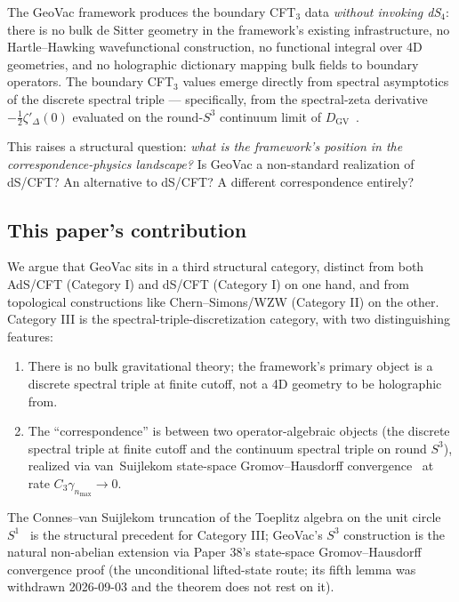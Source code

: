 \documentclass[11pt,a4paper]{article}
\theoremstyle{plain}
\theoremstyle{definition}
\newcommand{\nmax}{n_{\max}}
\newcommand{\sthree}{S^{3}}
\newcommand{\DGV}{D_{\mathrm{GV}}}
\begin{document}
The GeoVac framework produces the boundary CFT$_{3}$ data
\emph{without invoking dS$_{4}$}: there is no bulk de Sitter
geometry in the framework's existing infrastructure, no Hartle--Hawking
wavefunctional construction, no functional integral over 4D
geometries, and no holographic dictionary mapping bulk fields to
boundary operators. The boundary CFT$_{3}$ values emerge directly
from spectral asymptotics of the discrete spectral triple ---
specifically, from the spectral-zeta derivative $-\tfrac{1}{2}
\zeta'_{\Delta}(0)$ evaluated on the round-$\sthree$ continuum limit
of $\DGV$~\cite{paper50}.

This raises a structural question: \emph{what is the framework's
position in the correspondence-physics landscape?} Is GeoVac a
non-standard realization of dS/CFT? An alternative to dS/CFT? A
different correspondence entirely?

\subsection{This paper's contribution}

We argue that GeoVac sits in a third structural category, distinct
from both AdS/CFT (Category I) and dS/CFT (Category I) on one hand,
and from topological constructions like Chern--Simons/WZW
(Category II) on the other. Category III is the
spectral-triple-discretization category, with two distinguishing
features:
\begin{enumerate}
\item There is no bulk gravitational theory; the framework's primary
object is a discrete spectral triple at finite cutoff, not a 4D
geometry to be holographic from.
\item The ``correspondence'' is between two operator-algebraic
objects (the discrete spectral triple at finite cutoff and the
continuum spectral triple on round $\sthree$), realized via
van~Suijlekom state-space Gromov--Hausdorff convergence~\cite{paper38} at rate
$C_{3} \gamma_{\nmax} \to 0$.
\end{enumerate}

The Connes--van Suijlekom truncation of the Toeplitz algebra on the
unit circle $S^{1}$~\cite{connes_vs2021} is the structural precedent
for Category III; GeoVac's $\sthree$ construction is the natural
non-abelian extension via Paper 38's state-space
Gromov--Hausdorff convergence proof (the unconditional lifted-state route;
its fifth lemma was withdrawn 2026-09-03 and the theorem does not rest on it).
\end{document}
